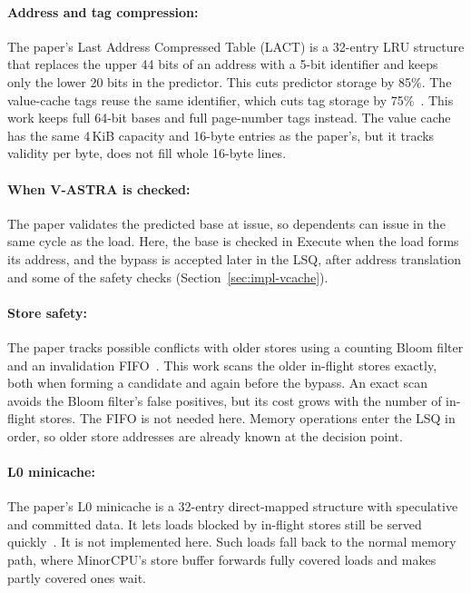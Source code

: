 \paragraph{Address and tag compression:} The paper's Last Address
Compressed Table (LACT) is a 32-entry LRU structure that replaces the
upper 44 bits of an address with a 5-bit identifier and keeps only the
lower 20 bits in the predictor. This cuts predictor storage by 85\%.
The value-cache tags reuse the same identifier, which cuts tag
storage by 75\%~\cite{ravenel2025architecting}. This work keeps full
64-bit bases and full page-number tags instead. The value cache has
the same 4\,KiB capacity and 16-byte entries as the paper's, but it
tracks validity per byte, does not fill whole 16-byte lines.

\paragraph{When V-ASTRA is checked:} The paper validates the predicted
base at issue, so dependents can issue in the same cycle as the load.
Here, the base is checked in Execute when the load forms its address,
and the bypass is accepted later in the LSQ, after address translation
and some of the safety checks (Section~\ref{sec:impl-vcache}).

\paragraph{Store safety:} The paper tracks possible conflicts with
older stores using a counting Bloom filter and an invalidation
FIFO~\cite{ravenel2025architecting}. This work scans the older
in-flight stores exactly, both when forming a candidate and again
before the bypass. An exact scan avoids the Bloom filter's false
positives, but its cost grows with the number of in-flight stores.
The FIFO is not needed here. Memory operations enter the LSQ in
order, so older store addresses are already known at the decision
point.

\paragraph{L0 minicache:} The paper's L0 minicache is a 32-entry
direct-mapped structure with speculative and committed data. It lets
loads blocked by in-flight stores still be served
quickly~\cite{ravenel2025architecting}. It is not implemented here.
Such loads fall back to the normal memory path, where MinorCPU's
store buffer forwards fully covered loads and makes partly covered
ones wait.

